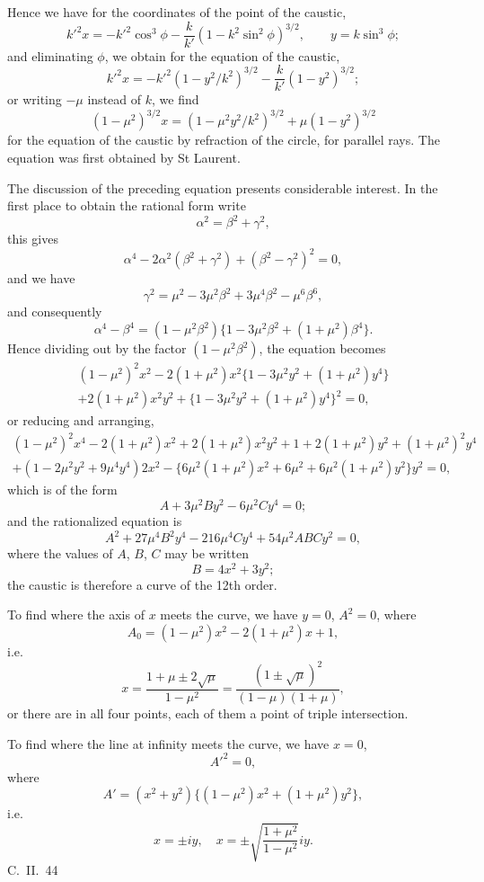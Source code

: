 \documentclass[11pt,a4paper]{book}
\begin{document}
\begin{center}
Hence we have for the coordinates of the point of the caustic,
\[k'^2x = -k'^2\cos^3\phi - \frac{k}{k'}(1-k^2\sin^2\phi)^{3/2},\qquad y = k\sin^3\phi;\]
and eliminating $\phi$, we obtain for the equation of the caustic,
\[k'^2x = -k'^2(1-y^2/k^2)^{3/2} - \frac{k}{k'}(1-y^2)^{3/2};\]
or writing $-\mu$ instead of $k$, we find
\[(1-\mu^2)^{3/2}x = (1-\mu^2y^2/k^2)^{3/2} + \mu(1-y^2)^{3/2}\]
for the equation of the caustic by refraction of the circle, for parallel rays.
The equation was first obtained by St Laurent.

The discussion of the preceding equation presents considerable interest. In the
first place to obtain the rational form write
\[\alpha^2 = \beta^2 + \gamma^2,\]
this gives
\[\alpha^4 - 2\alpha^2(\beta^2 + \gamma^2) + (\beta^2 - \gamma^2)^2 = 0,\]
and we have
\[\gamma^2 = \mu^2 - 3\mu^2\beta^2 + 3\mu^4\beta^2 - \mu^6\beta^6,\]
and consequently
\[\alpha^4 - \beta^4 = (1-\mu^2\beta^2)\{1 - 3\mu^2\beta^2 + (1+\mu^2)\beta^4\}.\]
Hence dividing out by the factor $(1-\mu^2\beta^2)$, the equation becomes
\begin{multline*}
(1-\mu^2)^2x^2 - 2(1+\mu^2)x^2\{1 - 3\mu^2y^2 + (1+\mu^2)y^4\}\\
+ 2(1+\mu^2)x^2y^2 + \{1 - 3\mu^2y^2 + (1+\mu^2)y^4\}^2 = 0,
\end{multline*}
or reducing and arranging,
\begin{multline*}
(1-\mu^2)^2x^4 - 2(1+\mu^2)x^2 + 2(1+\mu^2)x^2y^2 + 1 + 2(1+\mu^2)y^2 + (1+\mu^2)^2y^4\\
+ (1 - 2\mu^2y^2 + 9\mu^4y^4)2x^2 - \{6\mu^2(1+\mu^2)x^2 + 6\mu^2 + 6\mu^2(1+\mu^2)y^2\}y^2 = 0,
\end{multline*}
which is of the form
\[A + 3\mu^2By^2 - 6\mu^2Cy^4 = 0;\]
and the rationalized equation is
\[A^2 + 27\mu^4B^2y^4 - 216\mu^4Cy^4 + 54\mu^2ABCy^2 = 0,\]
where the values of $A$, $B$, $C$ may be written
\[B = 4x^2 + 3y^2;\]
the caustic is therefore a curve of the 12th order.

To find where the axis of $x$ meets the curve, we have $y = 0$, $A^2 = 0$, where
\[A_0 = (1-\mu^2)x^2 - 2(1+\mu^2)x + 1,\]
i.e.
\[x = \frac{1+\mu \pm 2\sqrt{\mu}}{1-\mu^2} = \frac{(1\pm\sqrt{\mu})^2}{(1-\mu)(1+\mu)},\]
or there are in all four points, each of them a point of triple intersection.

To find where the line at infinity meets the curve, we have $x = 0$,
\[A'^2 = 0,\]
where
\[A' = (x^2+y^2)\{(1-\mu^2)x^2 + (1+\mu^2)y^2\},\]
i.e.
\[x = \pm iy,\quad x = \pm\sqrt{\frac{1+\mu^2}{1-\mu^2}}iy.\]
\hfill C.~II.~44
\clearpage



\end{center}
\end{document}
